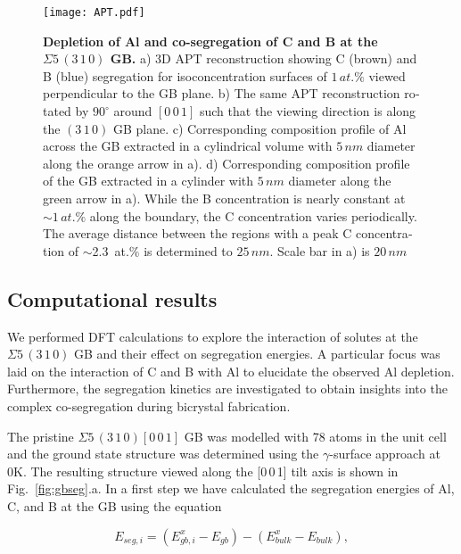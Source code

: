 \documentclass[12pt,a4paper,twoside,twocolumn,english,english]{article}
\begin{document}
\begin{otherlanguage}{english}
\begin{figure*}[htbp]
  \texttt{[image: APT.pdf]}
\caption{\textbf{Depletion of Al and co-segregation of C and B at the $\Sigma 5\,(3\,1\,0)$ GB.} a) 3D APT reconstruction showing C (brown) and B (blue) segregation for isoconcentration surfaces of $1 \,at.\%$ viewed perpendicular to the GB plane. b) The same APT reconstruction rotated by $90^\circ$ around $[0\,0\,1]$ such that the viewing direction is along the $(3\,1\,0)$ GB plane. c) Corresponding composition profile of Al across the GB extracted in a cylindrical volume with $5\,nm$ diameter along the orange arrow in a). d) Corresponding composition profile of the GB extracted in a cylinder with $5\,nm$ diameter along the green arrow in a). While the B concentration is nearly constant at $\sim 1\,at. \%$ along the boundary, the C concentration varies periodically. The average distance between the regions with a peak C concentration of $\sim$2.3~at.$\%$ is determined to $25\,nm$. Scale bar in a) is $20\,nm$}
\label{APT}
\end{figure*}

\subsection*{Computational results}
We performed DFT calculations to explore the interaction of solutes at the $\Sigma 5\,(3\,1\,0)$ GB and their effect on segregation energies. A particular focus was laid on the interaction of C and B with Al to elucidate the observed Al depletion. Furthermore, the segregation kinetics are investigated to obtain insights into the complex co-segregation during bicrystal fabrication.

The pristine $\Sigma 5\,(3\,1\,0)[0\,0\,1]$ GB was modelled with 78 atoms in the unit cell and the ground state structure was determined using the $\gamma$-surface approach \cite{scheiber_ab_2016} at 0K. The resulting structure viewed along the [0\,0\,1] tilt axis is shown in Fig.~\ref{fig:gbseg}.a. In a first step we have calculated the segregation energies of Al, C, and B at the GB using the equation

\begin{equation}
E_{seg,i} = \left(E_{gb,i}^x - E_{gb}\right) - \left(E_{bulk}^x - E_{bulk}\right),
    \label{eq:eseg}
\end{equation}


\end{otherlanguage}
\end{document}
